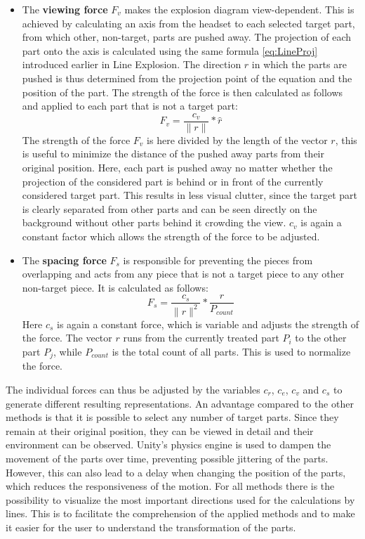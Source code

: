 \begin{itemize}
	\item The \textbf{viewing force} $F_v$ makes the explosion diagram view-dependent. 
	This is achieved by calculating an axis from the headset to each selected target part, from which other, non-target, parts are pushed away. 
	The projection of each part onto the axis is calculated using the same formula \ref{eq:LineProj} introduced earlier in Line Explosion.
	The direction $r$ in which the parts are pushed is thus determined from the projection point of the equation and the position of the part. 
	The strength of the force is then calculated as follows and applied to each part that is not a target part:
	\begin{equation}
		F_v = \frac{c_v}{\|r\|} * \hat{r}
		\label{eq:FB_viewingForce}
	\end{equation}
	The strength of the force $F_v$ is here divided by the length of the vector $r$, this is useful to minimize the distance of the pushed away parts from their original position. 
	Here, each part is pushed away no matter whether the projection of the considered part is behind or in front of the currently considered target part. 
	This results in less visual clutter, since the target part is clearly separated from other parts and can be seen directly on the background without other parts behind it crowding the view. 
	$c_v$ is again a constant factor which allows the strength of the force to be adjusted.
	\item The \textbf{spacing force} $F_s$ is responsible for preventing the pieces from overlapping and acts from any piece that is not a target piece to any other non-target piece. It is calculated as follows:
	\begin{equation}
	F_s = \frac{c_s}{\|r\|^2} * \frac{r}{P_{count}}
	\label{eq:FB_spacingForce}
	\end{equation}
	Here $c_s$ is again a constant force, which is variable and adjusts the strength of the force. 
	The vector $r$ runs from the currently treated part $P_i$ to the other part $P_j$, while $P_{count}$ is the total count of all parts. 
	This is used to normalize the force. 
\end{itemize}
The individual forces can thus be adjusted by the variables $c_r$, $c_e$, $c_v$ and $c_s$ to generate different resulting representations. 
An advantage compared to the other methods is that it is possible to select any number of target parts. Since they remain at their original position, they can be viewed in detail and their environment can be observed.   
Unity's physics engine is used to dampen the movement of the parts over time, preventing possible jittering of the parts. 
However, this can also lead to a delay when changing the position of the parts, which reduces the responsiveness of the motion.
For all methods there is the possibility to visualize the most important directions used for the calculations by lines. 
This is to facilitate the comprehension of the applied methods and to make it easier for the user to understand the transformation of the parts.

